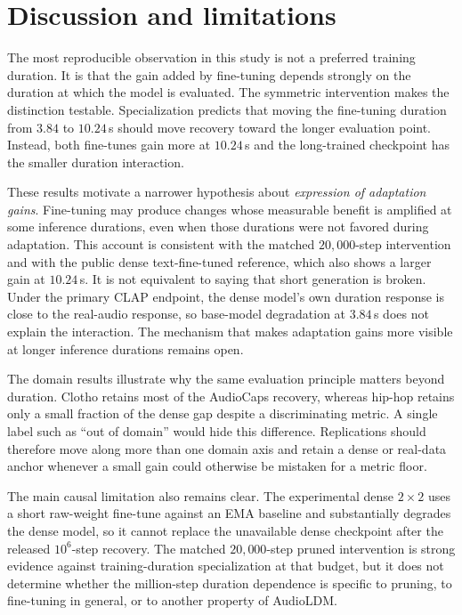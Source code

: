 \section{Discussion and limitations}
The most reproducible observation in this study is not a preferred training duration. It is that the gain added by fine-tuning depends strongly on the duration at which the model is evaluated. The symmetric intervention makes the distinction testable. Specialization predicts that moving the fine-tuning duration from $3.84$ to $10.24$\,s should move recovery toward the longer evaluation point. Instead, both fine-tunes gain more at $10.24$\,s and the long-trained checkpoint has the smaller duration interaction.

These results motivate a narrower hypothesis about \emph{expression of adaptation gains}. Fine-tuning may produce changes whose measurable benefit is amplified at some inference durations, even when those durations were not favored during adaptation. This account is consistent with the matched $20{,}000$-step intervention and with the public dense text-fine-tuned reference, which also shows a larger gain at $10.24$\,s. It is not equivalent to saying that short generation is broken. Under the primary CLAP endpoint, the dense model's own duration response is close to the real-audio response, so base-model degradation at $3.84$\,s does not explain the interaction. The mechanism that makes adaptation gains more visible at longer inference durations remains open.

The domain results illustrate why the same evaluation principle matters beyond duration. Clotho retains most of the AudioCaps recovery, whereas hip-hop retains only a small fraction of the dense gap despite a discriminating metric. A single label such as ``out of domain'' would hide this difference. Replications should therefore move along more than one domain axis and retain a dense or real-data anchor whenever a small gain could otherwise be mistaken for a metric floor.

The main causal limitation also remains clear. The experimental dense $2\times2$ uses a short raw-weight fine-tune against an EMA baseline and substantially degrades the dense model, so it cannot replace the unavailable dense checkpoint after the released $10^{6}$-step recovery. The matched $20{,}000$-step pruned intervention is strong evidence against training-duration specialization at that budget, but it does not determine whether the million-step duration dependence is specific to pruning, to fine-tuning in general, or to another property of AudioLDM.

